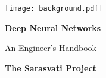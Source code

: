 \titlepage %
	{\texttt{[image: background.pdf]}} %
	{ %
		\centering\sffamily %
		{\Huge\bfseries Deep Neural Networks\par} %
		\vspace{16pt} %
		{\LARGE An Engineer's Handbook\par} %
		\vspace{24pt} %
		{\huge\bfseries The Sarasvati Project\par} %
	}